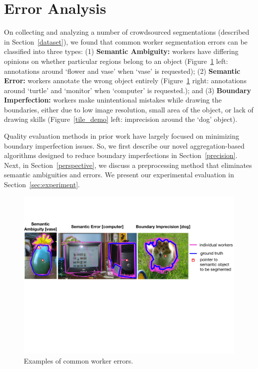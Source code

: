 \documentclass[letterpaper]{article}
\begin{document}
\section{Error Analysis\label{sec:error}}
\par On collecting and analyzing a number of crowdsourced segmentations (described in Section~\ref{dataset}), we found that common worker segmentation errors can be classified into three types: (1) \textbf{Semantic Ambiguity:} workers have differing opinions on whether particular regions belong to an object (Figure~\ref{error_examples} left: annotations around `flower and vase' when `vase' is requested); (2) \textbf{Semantic Error:} workers annotate the wrong object entirely (Figure~\ref{error_examples} right: annotations around `turtle' and `monitor' when `computer' is requested.); and (3) \textbf{Boundary Imperfection:} workers make unintentional mistakes while drawing the boundaries, either due to low image resolution, small area of the object, or lack of drawing skills (Figure~\ref{tile_demo} left: imprecision around the `dog' object).
\par Quality evaluation methods in prior work have largely focused on minimizing boundary imperfection issues. So, we first describe our novel aggregation-based algorithms designed to reduce boundary imperfections in Section~\ref{precision}. Next, in Section~\ref{perspective}, we discuss a preprocessing method that eliminates semantic ambiguities and errors.
We present our experimental evaluation in Section~\ref{sec:experiment}.
\begin{figure}[h!]
    \centering
    \includegraphics[width=\linewidth]{plots/errors.pdf}
    \caption{Examples of common worker errors.}
    \label{error_examples}
\end{figure}
\end{document}
